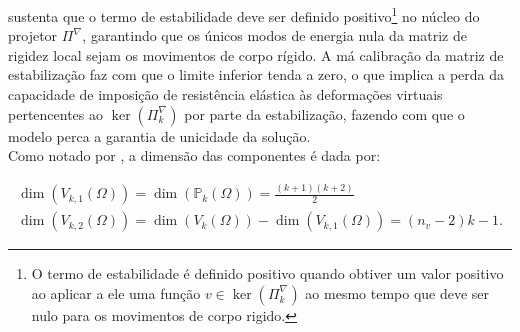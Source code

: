     \indent \citet{virtualelementmethodgeneralsecondorderellipticproblemspolygonalmeshes2016} sustenta que o termo de estabilidade deve ser definido positivo\footnote{O termo de estabilidade é definido positivo quando obtiver um valor positivo ao aplicar a ele uma função $v \in \ker(\Pi_k^\nabla)$ ao mesmo tempo que deve ser nulo para os movimentos de corpo rigido.} no núcleo do projetor $\Pi^\nabla$, garantindo que os únicos modos de energia nula da matriz de rigidez local sejam os movimentos de corpo rígido. A má calibração da matriz de estabilização faz com que o limite inferior tenda a zero, o que implica a perda da capacidade de imposição de resistência elástica às deformações virtuais pertencentes ao $\ker(\Pi_k^\nabla)$ por parte da estabilização, fazendo com que o modelo perca a garantia de unicidade da solução.\\
    \indent Como notado por \citet{illconditioningvirtualelementmethodstabilizationsbases2018}, a dimensão das componentes é dada por:

    \begin{equation}
        \begin{aligned}
            \dim(V_{k,1}(\Omega)) = \dim(\mathbb{P}_{k}(\Omega)) = \frac{(k+1)(k+2)}{2} \\
            \dim(V_{k,2}(\Omega)) = \dim(V_{k}(\Omega)) - \dim(V_{k,1}(\Omega)) = (n_v - 2) k - 1. 
        \end{aligned}
    \end{equation}

